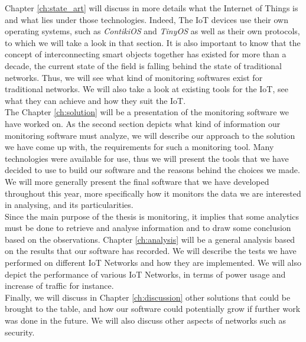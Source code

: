 Chapter \ref{ch:state_art} will discuss in more details what the Internet of Things is and what lies under those technologies. Indeed, The IoT devices use their own operating systems, such as \textit{ContikiOS} and \textit{TinyOS} as well as their own protocols, to which we will take a look in that section. It is also important to know that the concept of interconnecting smart objects together has existed for more than a decade, the current state of the field is falling behind the state of traditional networks. Thus, we will see what kind of monitoring softwares exist for traditional networks. We will also take a look at existing tools for the IoT, see what they can achieve and how they suit the IoT.\\

The Chapter \ref{ch:solution} will be a presentation of the monitoring software we have worked on. As the second section depicts what kind of information our monitoring software must analyze, we will describe our approach to the solution we have come up with, the requirements for such a monitoring tool. Many technologies were available for use, thus we will present the tools that we have decided to use to build our software and the reasons behind the choices we made. We will more generally present the final software that we have developed throughout this year, more specifically how it monitors the data we are interested in analysing, and its particularities. \\

Since the main purpose of the thesis is monitoring, it implies that some analytics must be done to retrieve and analyse information and to draw some conclusion based on the observations. Chapter \ref{ch:analysis} will be a general analysis based on the results that our software has recorded. We will describe the tests we have performed on different IoT Networks and how they are implemented. We will also depict the performance of various IoT Networks, in terms of power usage and increase of traffic for instance.\\

Finally, we will discuss in Chapter \ref{ch:discussion} other solutions that could be brought to the table, and how our software could potentially grow if further work was done in the future. We will also discuss other aspects of networks such as security.
